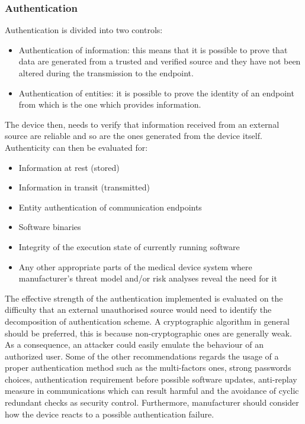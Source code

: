 \documentclass{Configuration_Files/PoliMi3i_thesis}
\begin{document}
\subsubsection{Authentication}
Authentication is divided into two controls: 
\begin{itemize}
	\item Authentication of information: this means that it is possible to prove that data are generated from a trusted and verified source and they have not been altered during the transmission to the endpoint.
	\item Authentication of entities: it is possible to prove the identity of an endpoint from which is the one which provides information.
\end{itemize}
The device then, needs to verify that information received from an external source are reliable and so are the ones generated from the device itself. 
Authenticity can then be evaluated for:
\begin{itemize}
	\item Information at rest (stored)
	\item Information in transit (transmitted)
	\item Entity authentication of communication endpoints 
	\item Software binaries
	\item Integrity of the execution state of currently running software 
	\item Any other appropriate parts of the medical device system where manufacturer’s threat model and/or risk analyses reveal the need for it
\end{itemize}
The effective strength of the authentication implemented is evaluated on the difficulty that an external unauthorised source would need to identify the decomposition of authentication scheme.
A cryptographic algorithm in general should be preferred, this is because non-cryptographic ones are generally weak. As a consequence, an attacker could easily emulate the behaviour of an authorized user.
Some of the other recommendations regards the usage of a proper authentication method such as the multi-factors ones, strong passwords choices, authentication requirement before possible software updates, anti-replay measure in communications which can result harmful and the avoidance of cyclic redundant checks as security control.
Furthermore, manufacturer should consider how the device reacts to a possible authentication failure.  
\end{document}
